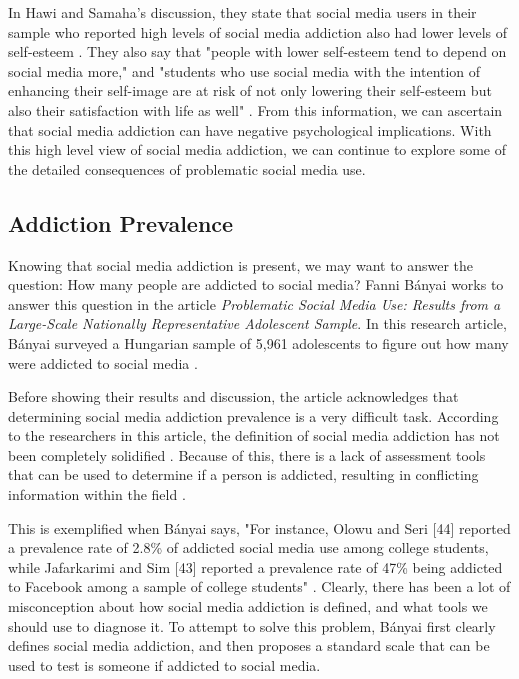 \documentclass[12pt, journal, compsoc]{IEEEtran}
\begin{document}
In Hawi and Samaha's discussion, they state that social media users in their sample who reported high levels of social media addiction also had lower levels of self-esteem \cite{UniversityStudents}. They also say that "people with lower self-esteem tend to depend on social media more," and "students who use social media with the intention of enhancing their self-image are at risk of not only lowering their self-esteem but also their satisfaction with life as well" \cite{UniversityStudents}. From this information, we can ascertain that social media addiction can have negative psychological implications. With this high level view of social media addiction, we can continue to explore some of the detailed consequences of problematic social media use.

\subsection{Addiction Prevalence}

\hspace{12pt} Knowing that social media addiction is present, we may want to answer the question: How many people are addicted to social media? Fanni B\'anyai works to answer this question in the article \textit{Problematic Social Media Use: Results from a Large-Scale Nationally Representative Adolescent Sample}. In this research article, B\'anyai surveyed a Hungarian sample of 5,961 adolescents to figure out how many were addicted to social media \cite{ProblematicUse}.

Before showing their results and discussion, the article acknowledges that determining social media addiction prevalence is a very difficult task. According to the researchers in this article, the definition of social media addiction has not been completely solidified \cite{ProblematicUse}. Because of this, there is a lack of assessment tools that can be used to determine if a person is addicted, resulting in conflicting information within the field \cite{ProblematicUse}. 

This is exemplified when B\'anyai says, "For instance, Olowu and Seri [44] reported a prevalence rate of 2.8\% of addicted social media use among college students, while Jafarkarimi and Sim [43] reported a prevalence rate of 47\% being addicted to Facebook among a sample of college students" \cite{ProblematicUse}. Clearly, there has been a lot of misconception about how social media addiction is defined, and what tools we should use to diagnose it. To attempt to solve this problem, B\'anyai first clearly defines social media addiction, and then proposes a standard scale that can be used to test is someone if addicted to social media.
\end{document}
